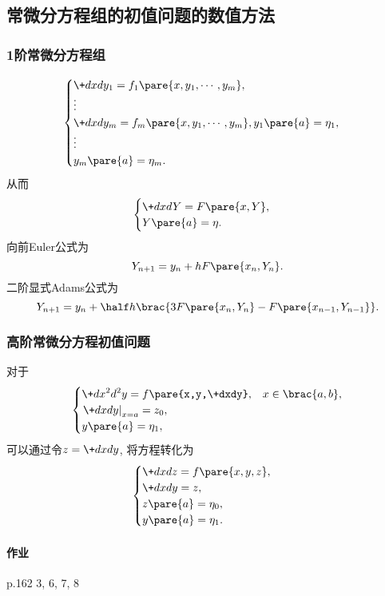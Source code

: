 \documentclass[hidelinks]{ctexart}
\begin{document}


\subsection{常微分方程组的初值问题的数值方法} %
\label{sub:常微分方程组的初值问题的数值方法}

\subsubsection{1阶常微分方程组} %
\label{ssub:1阶常微分方程组}

\[ \begin{cases}
    \displaystyle \+dxd{y_1} = f_1\pare{x,y_1,\cdots,y_m}, \\
    \vdots\\
    \displaystyle \+dxd{y_m} = f_m\pare{x,y_1,\cdots,y_m},
    y_1\pare{a} = \eta_1, \\
    \vdots\\
    y_m\pare{a} = \eta_m.
\end{cases} \]
从而
\[ \begin{cases}
    \displaystyle \+dxdY = F\pare{x,Y}, \\
    Y\pare{a} = \eta.
\end{cases} \]
向前Euler公式为
\[ Y_{n+1} = y_n + hF\pare{x_n,Y_n}. \]
二阶显式Adams公式为
\[ Y_{n+1} = y_n + \half h\brac{3F\pare{x_n,Y_n} - F\pare{x_{n-1},Y_{n-1}}}. \]


\subsubsection{高阶常微分方程初值问题} %
\label{ssub:高阶常微分方程初值问题}

对于
\[ \begin{cases}
    \displaystyle \+d{x^2}d{^2y} = f\pare{x,y,\+dxdy}, & x\in\brac{a,b}, \\
    \displaystyle \left. \+dxdy \right\vert_{x=a} = z_0, \\
    \displaystyle y\pare{a} = \eta_1,
\end{cases} \]
可以通过令$\displaystyle z = \+dxdy$, 将方程转化为
\[ \begin{cases}
    \displaystyle \+dxdz = f\pare{x,y,z}, \\
    \displaystyle \+dxdy = z, \\
    z\pare{a} = \eta_0, \\
    y\pare{a} = \eta_1.
\end{cases} \]

\paragraph{作业} %
\label{par:作业}

p.162 3, 6, 7, 8




\end{document}
